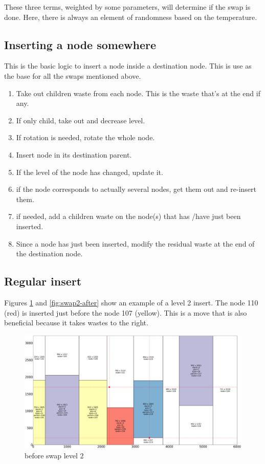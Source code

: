 \documentclass{roadef}
\begin{document}
        These three terms, weighted by some parameters, will determine if the swap is done. Here, there is always an element of randomness based on the temperature.

    \subsection{Inserting a node somewhere}

        This is the basic logic to insert a node inside a destination node. This is use as the base for all the swaps mentioned above.

        \begin{enumerate}

            \item Take out children waste from each node. This is the waste that's at the end if any.
            \item If only child, take out and decrease level.
            \item If rotation is needed, rotate the whole node.
            \item Insert node in its destination parent.
            \item If the level of the node has changed, update it.
            \item if the node corresponds to actually several nodes, get them out and re-insert them.
            \item if needed, add a children waste on the node(s) that has /have just been inserted.
            \item Since a node has just been inserted, modify the residual waste at the end of the destination node.

        \end{enumerate}

    \subsection{Regular insert}

        Figures \ref{fig:swap2-before} and \ref{fig:swap2-after} show an example of a level 2 insert.
        The node 110 (red) is inserted just before the node 107 (yellow). This is a move that is also beneficial because it takes wastes to the right.

        \begin{figure}
            \centering
            \includegraphics[width=0.7\linewidth]{swap_2_before.png}
            \caption{before swap level 2} \label{fig:swap2-before}
        \end{figure}
\end{document}
